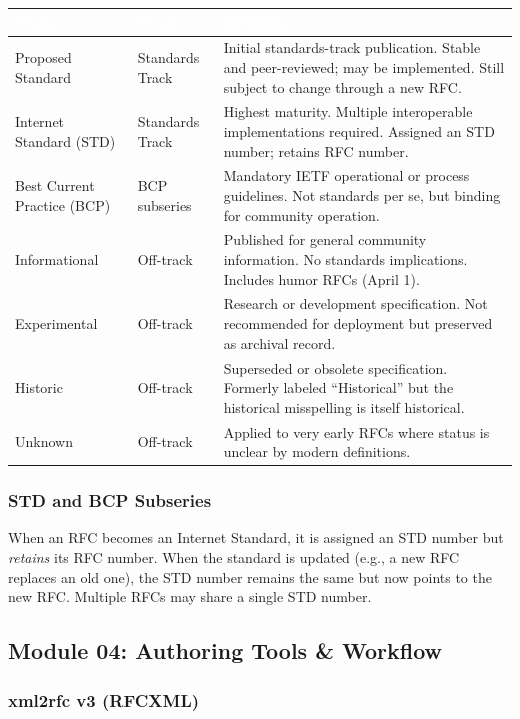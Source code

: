 \documentclass[11pt,letterpaper]{article}
\newcommand{\tableheader}[1]{\textbf{\sffamily\textcolor{white}{#1}}}
\begin{document}
\begin{center}
\begin{tabularx}{\textwidth}{L{3.5cm}L{2.5cm}X}
\toprule
{}
\tableheader{Status} & \tableheader{Track} & \tableheader{Definition} \\
\midrule
Proposed Standard & Standards Track & Initial standards-track publication. Stable and peer-reviewed; may be implemented. Still subject to change through a new RFC. \\
Internet Standard (STD) & Standards Track & Highest maturity. Multiple interoperable implementations required. Assigned an STD number; retains RFC number. \\
Best Current Practice (BCP) & BCP subseries & Mandatory IETF operational or process guidelines. Not standards per se, but binding for community operation. \\
Informational & Off-track & Published for general community information. No standards implications. Includes humor RFCs (April 1). \\
Experimental & Off-track & Research or development specification. Not recommended for deployment but preserved as archival record. \\
Historic & Off-track & Superseded or obsolete specification. Formerly labeled ``Historical'' but the historical misspelling is itself historical. \\
Unknown & Off-track & Applied to very early RFCs where status is unclear by modern definitions. \\
\bottomrule
\end{tabularx}
\end{center}

\subsubsection{STD and BCP Subseries}

When an RFC becomes an Internet Standard, it is assigned an STD number but \textit{retains} its RFC number. When the standard is updated (e.g., a new RFC replaces an old one), the STD number remains the same but now points to the new RFC. Multiple RFCs may share a single STD number.

\subsection{Module 04: Authoring Tools \& Workflow}

\subsubsection{xml2rfc v3 (RFCXML)}
\end{document}
